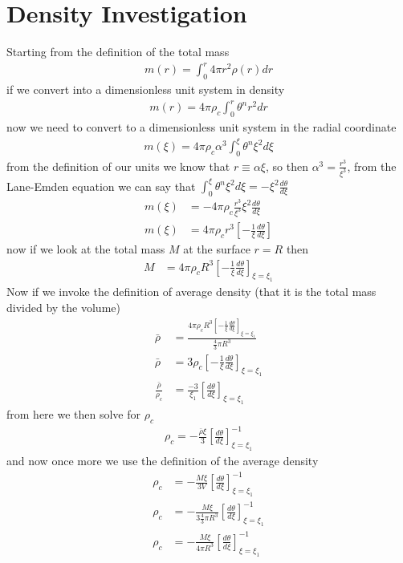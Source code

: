 \section{Density Investigation}
Starting from the definition of the total mass
\begin{align*}
    m(r) = \int_{0}^{r}4\pi r^{2}\rho(r)dr
\end{align*}
if we convert into a dimensionless unit system in density
\begin{align*}
    m(r) = 4\pi \rho_{c}\int_{0}^{r}\theta^{n}r^{2}dr
\end{align*}
now we need to convert to a dimensionless unit system in the radial coordinate
\begin{align*}
    m(\xi) = 4\pi\rho_{c}\alpha^{3}\int_{0}^{\xi}\theta^{n}\xi^{2}d\xi
\end{align*}
from the definition of our units we know that $r\equiv\alpha\xi$, so then $\alpha^{3} = \frac{r^{3}}{\xi^{3}}$,
from the Lane-Emden equation we can say that $\int_{0}^{\xi}\theta^{n}\xi^{2}d\xi = -\xi^{2}\frac{d\theta}{d\xi}$
\begin{align*}
    m(\xi) &= -4\pi\rho_{c}\frac{r^{3}}{\xi^{3}}\xi^{2}\frac{d\theta}{d\xi} \\
    m(\xi) &= 4\pi\rho_{c}r^{3}\left[-\frac{1}{\xi}\frac{d\theta}{d\xi}\right]
\end{align*}
now if we look at the total mass $M$ at the surface $r=R$ then
\begin{align*}
    M &= 4\pi\rho_{c}R^{3}\left[-\frac{1}{\xi}\frac{d\theta}{d\xi}\right]_{\xi=\xi_{1}}
\end{align*}
Now if we invoke the definition of average density (that it is the total mass divided by the volume)
\begin{align*}
    \bar{\rho} &= \frac{4\pi\rho_{c}R^{3}\left[-\frac{1}{\xi}\frac{d\theta}{d\xi}\right]_{\xi=\xi_{1}}}{\frac{4}{3}\pi R^{3}} \\
    \bar{\rho} &= 3\rho_{c}\left[-\frac{1}{\xi}\frac{d\theta}{d\xi}\right]_{\xi=\xi_{1}} \\
    \frac{\bar{\rho}}{\rho_{c}} &= \frac{-3}{\xi_{1}}\left[\frac{d\theta}{d\xi}\right]_{\xi=\xi_{1}}
\end{align*}
from here we then solve for $\rho_{c}$
\begin{align*}
    \rho_{c} = -\frac{\bar{\rho}\xi}{3}\left[\frac{d\theta}{d\xi}\right]^{-1}_{\xi=\xi_{1}}
\end{align*}
and now once more we use the definition of the average density
\begin{align*}
    \rho_{c} &= -\frac{M\xi}{3V}\left[\frac{d\theta}{d\xi}\right]^{-1}_{\xi=\xi_{1}} \\
    \rho_{c} &= -\frac{M\xi}{3\frac{4}{3}\pi R^{3}}\left[\frac{d\theta}{d\xi}\right]^{-1}_{\xi=\xi_{1}} \\
    \rho_{c} &= -\frac{M\xi}{4\pi R^{3}}\left[\frac{d\theta}{d\xi}\right]^{-1}_{\xi=\xi_{1}}
\end{align*}

